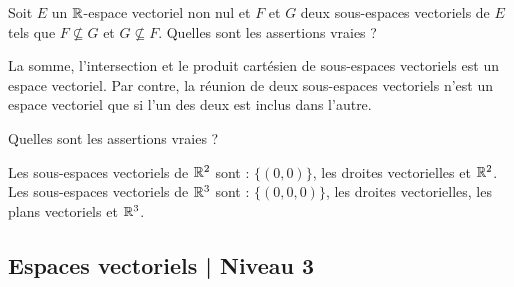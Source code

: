 \begin{question}
Soit $E$ un $\mathbb{R}$-espace vectoriel non nul et $F$ et $G$ deux sous-espaces vectoriels de $E$ tels que $F\nsubseteq G$ et  $G\nsubseteq F$. Quelles sont les assertions vraies ?
\begin{answers}  
\end{answers}
\begin{explanations} La somme, l'intersection et le produit cartésien de sous-espaces vectoriels est un espace vectoriel. Par contre, la réunion de deux sous-espaces vectoriels n'est un espace vectoriel que si l'un des deux est inclus dans l'autre.
\end{explanations}
\end{question}




\begin{question}
Quelles sont les assertions vraies ?
\begin{answers}  
\end{answers}
\begin{explanations} Les sous-espaces vectoriels de $\mathbb{R}^2$ sont : $\{(0,0)\}$, les droites vectorielles et $\mathbb{R}^2$. Les sous-espaces vectoriels de $\mathbb{R}^3$ sont : $\{(0,0,0)\}$, les droites vectorielles, les plans vectoriels et $\mathbb{R}^3$.
\end{explanations}
\end{question}



\subsection{Espaces vectoriels | Niveau 3}



